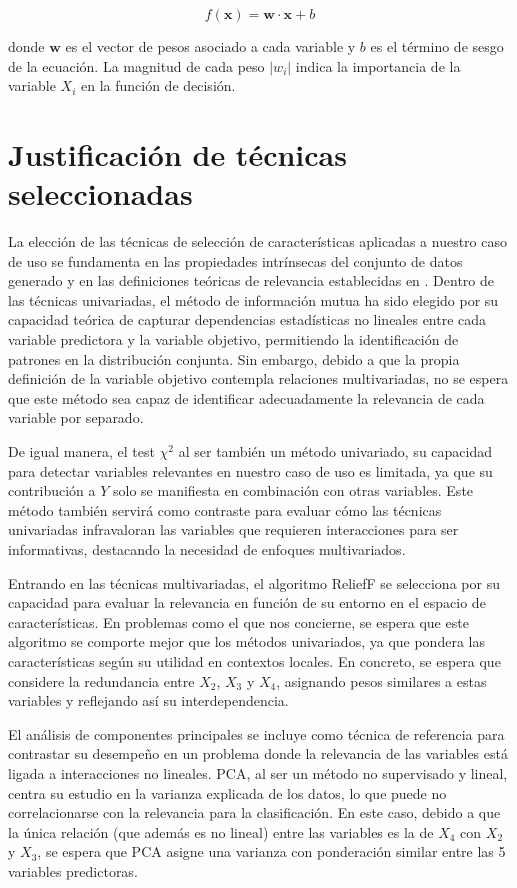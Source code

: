 \documentclass[a4paper,12pt]{article}
\begin{document}
\[
    f(\mathbf{x}) = \mathbf{w} \cdot \mathbf{x} + b
\]

\noindent
donde \( \mathbf{w} \) es el vector de pesos asociado a cada variable y \(b\) es el término de sesgo de la ecuación. La magnitud de cada peso \(|w_i|\) indica la importancia de la variable \(X_i\) en la función de decisión.


\newpage
\section{Justificación de técnicas seleccionadas} \label{sec:justificacion}

La elección de las técnicas de selección de características aplicadas a nuestro caso de uso se fundamenta en las propiedades intrínsecas del conjunto de datos generado y en las definiciones teóricas de relevancia establecidas en \cite{kohavi1997, guyon2003}. Dentro de las técnicas univariadas, el método de información mutua ha sido elegido por su capacidad teórica de capturar dependencias estadísticas no lineales entre cada variable predictora y la variable objetivo, permitiendo la identificación de patrones en la distribución conjunta. Sin embargo, debido a que la propia definición de la variable objetivo contempla relaciones multivariadas, no se espera que este método sea capaz de identificar adecuadamente la relevancia de cada variable por separado.

De igual manera, el test \(\chi^2\) al ser también un método univariado, su capacidad para detectar variables relevantes en nuestro caso de uso es limitada, ya que su contribución a \( Y \) solo se manifiesta en combinación con otras variables. Este método también servirá como contraste para evaluar cómo las técnicas univariadas infravaloran las variables que requieren interacciones para ser informativas, destacando la necesidad de enfoques multivariados.

Entrando en las técnicas multivariadas, el algoritmo ReliefF se selecciona por su capacidad para evaluar la relevancia en función de su entorno en el espacio de características. En problemas como el que nos concierne, se espera que este algoritmo se comporte mejor que los métodos univariados, ya que pondera las características según su utilidad en contextos locales. En concreto, se espera que considere la redundancia entre \( X_2 \), \( X_3 \) y \( X_4 \), asignando pesos similares a estas variables y reflejando así su interdependencia.

El análisis de componentes principales se incluye como técnica de referencia para contrastar su desempeño en un problema donde la relevancia de las variables está ligada a interacciones no lineales. PCA, al ser un método no supervisado y lineal, centra su estudio en la varianza explicada de los datos, lo que puede no correlacionarse con la relevancia para la clasificación. En este caso, debido a que la única relación (que además es no lineal) entre las variables es la de \( X_4 \) con \( X_2 \) y \( X_3 \), se espera que PCA asigne una varianza con ponderación similar entre las 5 variables predictoras.
\end{document}
